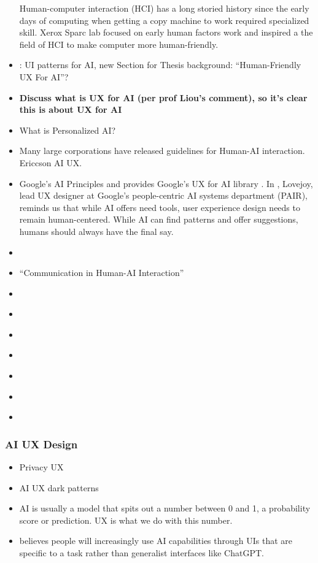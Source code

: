 \documentclass[
  letterpaper,
  DIV=11,
  numbers=noendperiod]{scrartcl}
\begin{document}
\begin{itemize}
  Human-computer interaction (HCI) has a long storied history since the
  early days of computing when getting a copy machine to work required
  specialized skill. Xerox Sparc lab focused on early human factors work
  and inspired a the field of HCI to make computer more human-friendly.
\item
  \citet{soleimani10UIPatterns2018}: UI patterns for AI, new Section for
  Thesis background: ``Human-Friendly UX For AI''?
\item
  \textbf{Discuss what is UX for AI (per prof Liou's comment), so it's
  clear this is about UX for AI}
\item
  What is Personalized AI?
\item
  Many large corporations have released guidelines for Human-AI
  interaction. \citet{mikaelerikssonbjorlingUXDesignAI} Ericcson AI UX.
\item
  Google's AI Principles and provides Google's UX for AI library
  \citep{joshlovejoyUXAI, googleOurPrinciplesGoogle}. In
  \citet{designportlandHumansHaveFinal2018}, Lovejoy, lead UX designer
  at Google's people-centric AI systems department (PAIR), reminds us
  that while AI offers need tools, user experience design needs to
  remain human-centered. While AI can find patterns and offer
  suggestions, humans should always have the final say.
\item
  \citet{harvardadvancedleadershipinitiativeHumanAIInteractionArtificial2021}
\item
  \citet{videolectureschannelCommunicationHumanAIInteraction2022}
  ``Communication in Human-AI Interaction''
\item
  \citet{haiyizhuHumanAIInteractionFall2021}
\item
  \citet{akataResearchAgendaHybrid2020}
\item
  \citet{dignumAIPeoplePlaces2021}
\item
  \citet{boleizhouCVPR22Tutorial2022}
\item
  \citet{readyaiHumanAIInteractionHow2020}
\item
  \citet{vinuesaRoleArtificialIntelligence2020}
\item
  \citet{orozcoBudapestBicycleNetwork2020}
\end{itemize}

\subsubsection{AI UX Design}\label{ai-ux-design}

\begin{itemize}
\item
  Privacy UX \citet{jarovskyYouAreProbably2022}
\item
  AI UX dark patterns \citet{jarovskyDarkPatternsAI2022}
\item
  AI is usually a model that spits out a number between 0 and 1, a
  probability score or prediction. UX is what we do with this number.
\item
  \citet{baileyAIEducation2023} believes people will increasingly use AI
  capabilities through UIs that are specific to a task rather than
  generalist interfaces like ChatGPT.
\end{itemize}
\end{document}
